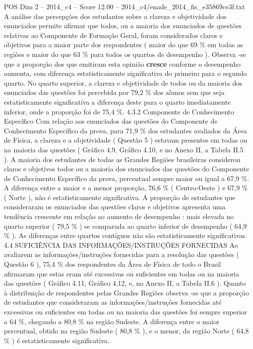 \begin{textsample}{POS Dim 2 – 2014\_c4 – Score 12.00 – 2014\_c4/enade\_2014\_fis\_e35869ce3f.txt}
A análise das percepções dos estudantes sobre a clareza e objetividade dos enunciados permite afirmar que todos, ou a maioria dos enunciados de questões relativas ao Componente de Formação Geral, foram considerados claros e objetivos para a maior parte dos respondentes ( maior do que 69 \% em todas as regiões e maior do que 63 \% para todos os quartos de desempenho ).
Observa -se que a proporção dos que emitiram esta opinião \textbf{cresce} conforme o desempenho aumenta, com diferença estatisticamente significativa do primeiro para o segundo quarto.
No quarto superior, a clareza e objetividade de todos ou da maioria dos enunciados das questões foi percebida por 79,2 \% dos alunos sem que seja estatisticamente significativa a diferença deste para o quarto imediatamente inferior, onde a proporção foi de 75,4 \%. 4.3.2 Componente de Conhecimento Específico Com relação aos enunciados das questões do Componente de Conhecimento Específico da prova, para 71,9 \% dos estudantes avaliados da Área de Física, a clareza e a objetividade ( Questão 5 ) estavam presentes em todas ou na maioria das questões ( Gráfico 4.9, Gráfico 4.10, e no Anexo II, a Tabela II.5 ).
A maioria dos estudantes de todas as Grandes Regiões brasileiras considerou claros e objetivos todos ou a maioria dos enunciados das questões do Componente de Conhecimento Específico da prova, percentual sempre maior ou igual a 67,9 \%.
A diferença entre a maior e a menor proporção, 76,6 \% ( Centro-Oeste ) e 67,9 \% ( Norte ), não é estatisticamente significativa.
A proporção de estudantes que consideraram os enunciados das questões claros e objetivos apresenta uma tendência crescente em relação ao aumento de desempenho : mais elevada no quarto superior ( 79,5 \% ) se comparada ao quarto inferior de desempenho ( 64,9 \% ).
As diferenças entre quartos contíguos não são estatisticamente significativas. 4.4 SUFICIÊNCIA DAS INFORMAÇÕES/INSTRUÇÕES FORNECIDAS Ao avaliarem as informações/instruções fornecidas para a resolução das questões ( Questão 6 ), 75,4 \% dos respondentes da Área de Física de todo o Brasil afirmaram que estas eram até excessivas ou suficientes em todas ou na maioria das questões ( Gráfico 4.11, Gráfico 4.12, e, no Anexo II, a Tabela II.6 ).
Quanto à distribuição de respondentes pelas Grandes Regiões observa -se que a proporção de estudantes que consideraram as informações/instruções fornecidas até excessivas ou suficientes em todas ou na maioria das questões foi sempre superior a 64 \%, chegando a 80,8 \% na região Sudeste.
A diferença entre o maior percentual, obtido na região Sudeste ( 80,8 \% ), e o menor, da região Norte ( 64,8 \% ) é estatisticamente significativa.

\end{textsample}
